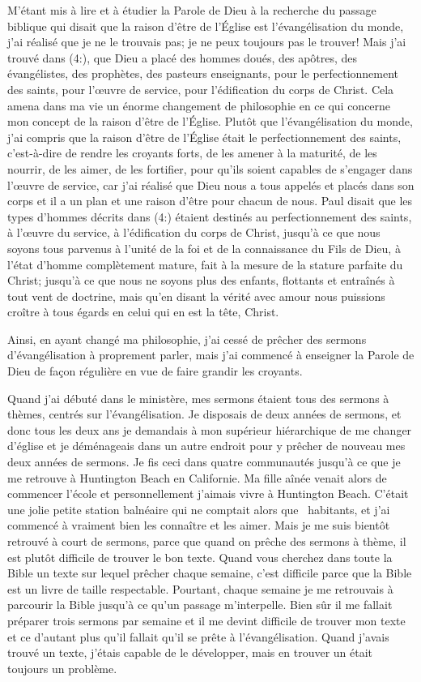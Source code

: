 M'étant mis à lire et à étudier la Parole de Dieu à la recherche du passage biblique qui disait que la raison d'être de
l'Église est l’évangélisation du monde, j'ai réalisé que je ne le trouvais pas; je ne peux toujours pas le trouver! Mais
j’ai trouvé dans (4:), que Dieu a placé des hommes doués, des apôtres, des évangélistes, des prophètes, des
pasteurs enseignants, pour le perfectionnement des saints, pour l’œuvre de service, pour l’édification du corps de
Christ. Cela amena dans ma vie un énorme changement de philosophie en ce qui concerne mon concept de la raison
d'être de l’Église. Plutôt que l'évangélisation du monde, j'ai compris que la raison d'être de l'Église était le
perfectionnement des saints, c'est-à-dire de rendre les croyants forts, de les amener à la maturité, de les nourrir, de
les aimer, de les fortifier, pour qu’ils soient capables de s’engager dans l’œuvre de service, car j'ai réalisé que Dieu
nous a tous appelés et placés dans son corps et il a un plan et une raison d'être pour chacun de nous. Paul disait
que les types d’hommes décrits dans (4:) étaient destinés au perfectionnement des saints, à l'œuvre du
service, à l'édification du corps de Christ, jusqu’à ce que nous soyons tous parvenus à l’unité de la foi et de la
connaissance du Fils de Dieu, à l’état d’homme complètement mature, fait à la mesure de la stature parfaite du
Christ; jusqu’à ce que nous ne soyons plus des enfants, flottants et entraînés à tout vent de doctrine, mais qu’en
disant la vérité avec amour nous puissions croître à tous égards en celui qui en est la tête, Christ.

Ainsi, en ayant changé ma philosophie, j’ai cessé de prêcher des sermons d'évangélisation à proprement parler, mais
j’ai commencé à enseigner la Parole de Dieu de façon régulière en vue de faire grandir les croyants.

Quand j’ai débuté dans le ministère, mes sermons étaient tous des sermons à thèmes, centrés sur l’évangélisation. Je
disposais de deux années de sermons, et donc tous les deux ans je demandais à mon supérieur hiérarchique de me
changer d’église et je déménageais dans un autre endroit pour y prêcher de nouveau mes deux années de sermons.
Je fis ceci dans quatre communautés jusqu’à ce que je me retrouve à Huntington Beach en Californie. Ma fille aînée
venait alors de commencer l’école et personnellement j’aimais vivre à Huntington Beach. C’était une jolie petite station
balnéaire qui ne comptait alors que ~habitants, et j'ai commencé à vraiment bien les connaître et les aimer. Mais
je me suis bientôt retrouvé à court de sermons, parce que quand on prêche des sermons à thème, il est plutôt difficile
de trouver le bon texte. Quand vous cherchez dans toute la Bible un texte sur lequel prêcher chaque semaine, c’est
difficile parce que la Bible est un livre de taille respectable. Pourtant, chaque semaine je me retrouvais à parcourir la
Bible jusqu’à ce qu'un passage m’interpelle. Bien sûr il me fallait préparer trois sermons par semaine et il me devint
difficile de trouver mon texte et ce d’autant plus qu’il fallait qu’il se prête à l’évangélisation. Quand j’avais trouvé un
texte, j’étais capable de le développer, mais en trouver un était toujours un problème.

